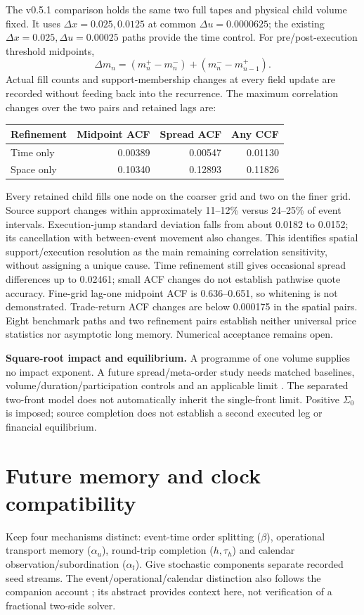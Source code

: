 \documentclass[11pt,a4paper]{article}
\newcommand{\du}{\Delta u}\newcommand{\dx}{\Delta x}
\begin{document}
The v0.5.1 comparison holds the same two full tapes and physical child
volume fixed. It uses $\dx=0.025,0.0125$ at common $\du=0.0000625$;
the existing $\dx=0.025,\du=0.00025$ paths provide the time control.
For pre/post-execution threshold midpoints,
\[
 \Delta m_n=(m_n^+-m_n^-)+(m_n^--m_{n-1}^+).
\]
Actual fill counts and support-membership changes at every field update
are recorded without feeding back into the recurrence. The maximum
correlation changes over the two pairs and retained lags are:
\begin{center}
\begin{tabular}{lrrr}
\toprule
Refinement & Midpoint ACF & Spread ACF & Any CCF\\
\midrule
Time only & 0.00389 & 0.00547 & 0.01130\\
Space only & 0.10340 & 0.12893 & 0.11826\\
\bottomrule
\end{tabular}
\end{center}
Every retained child fills one node on the coarser grid and two on the
finer grid. Source support changes within approximately 11--12\% versus
24--25\% of event intervals. Execution-jump standard deviation falls from
about 0.0182 to 0.0152; its cancellation with between-event movement also
changes. This identifies spatial support/execution resolution as the main
remaining correlation sensitivity, without assigning a unique cause.
Time refinement still gives occasional spread differences up to 0.02461;
small ACF changes do not establish pathwise quote accuracy. Fine-grid
lag-one midpoint ACF is 0.636--0.651, so whitening is not demonstrated.
Trade-return ACF changes are below 0.000175 in the spatial pairs. Eight
benchmark paths and two refinement pairs establish neither universal
price statistics nor asymptotic long memory. Numerical acceptance remains open.

\textbf{Square-root impact and equilibrium.} A programme of one volume
supplies no impact exponent. A future spread/meta-order study needs matched
baselines, volume/duration/participation controls and an applicable limit
\cite{impact}. The separated two-front model does not automatically inherit
the single-front limit. Positive $\Sigma_0$ is imposed; source completion
does not establish a second executed leg or financial equilibrium.

\newpage
\section{Future memory and clock compatibility}
Keep four mechanisms distinct: event-time order splitting ($\beta$),
operational transport memory ($\alpha_u$), round-trip completion ($h,\tau_h$)
and calendar observation/subordination ($\alpha_t$). Give stochastic
components separate recorded seed streams. The event/operational/calendar
distinction also follows the companion account \cite{clocks}; its abstract
provides context here, not verification of a fractional two-side solver.
\end{document}

